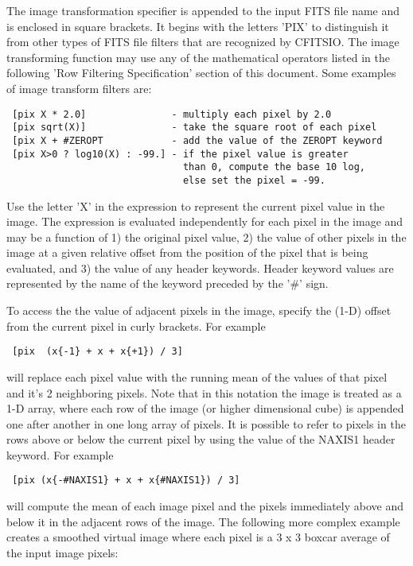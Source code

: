 \documentclass[11pt]{book}
\begin{document}
The image transformation specifier is appended to the input
FITS file name and is enclosed in square brackets.  It begins with the
letters 'PIX' to distinguish it from other types of FITS file filters
that are recognized by CFITSIO.  The image transforming function may
use any of the mathematical operators listed in the following
'Row Filtering Specification' section of this document.
Some examples of  image transform filters are:

\begin{verbatim}
 [pix X * 2.0]               - multiply each pixel by 2.0
 [pix sqrt(X)]               - take the square root of each pixel
 [pix X + #ZEROPT            - add the value of the ZEROPT keyword
 [pix X>0 ? log10(X) : -99.] - if the pixel value is greater
                               than 0, compute the base 10 log,
                               else set the pixel = -99.
\end{verbatim}
Use the letter 'X' in the expression to represent the current pixel value
in the image.  The expression is evaluated
independently for each pixel in the image and may be a function of 1) the
original pixel value, 2) the value of other pixels in the image at
a given relative offset from the position of the pixel that is being
evaluated, and 3) the value of
any header keywords.  Header keyword values are represented
by the name of the keyword preceded by the '\#' sign.


To access the the value of adjacent pixels in the image,
specify the (1-D) offset from the current pixel in curly brackets.
For example

\begin{verbatim}
 [pix  (x{-1} + x + x{+1}) / 3]
\end{verbatim}
will replace each pixel value with the running mean of the values of that
pixel and it's 2 neighboring pixels.  Note that in this notation the image
is treated as a 1-D array, where each row of the image (or higher dimensional
cube) is appended one after another in one long array of pixels.
It is possible to refer to pixels
in the rows above or below the current pixel by using the value of the
NAXIS1 header keyword.  For example

\begin{verbatim}
 [pix (x{-#NAXIS1} + x + x{#NAXIS1}) / 3]
\end{verbatim}
will compute the mean of each image pixel and the pixels immediately
above and below it in the adjacent rows of the image.
The following more complex example
creates a smoothed virtual image where each pixel
is a 3 x 3 boxcar average of the input image pixels:
\end{document}
